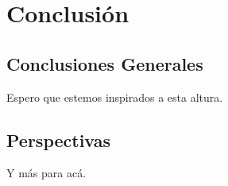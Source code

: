 \chapter{Conclusión}
\label{ch:conclusion}

\section{Conclusiones Generales}
Espero que estemos inspirados a esta altura.


\section{Perspectivas}
Y más para acá.
